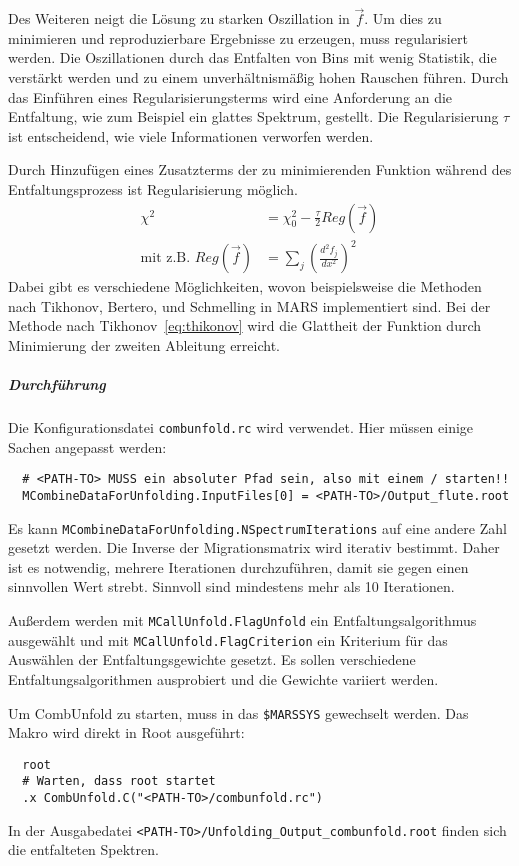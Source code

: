 Des Weiteren neigt die Lösung zu starken Oszillation in $\vec{f}$.
Um dies zu minimieren und reproduzierbare Ergebnisse zu erzeugen,
muss regularisiert werden.
Die Oszillationen durch das Entfalten von Bins mit wenig Statistik,
die verstärkt werden und zu einem unverhältnismäßig hohen Rauschen führen.
Durch das Einführen eines Regularisierungsterms wird eine Anforderung an die
Entfaltung, wie zum Beispiel ein glattes Spektrum, gestellt.
Die Regularisierung $\tau$ ist entscheidend, wie viele
Informationen verworfen werden.

Durch Hinzufügen eines Zusatzterms der zu minimierenden Funktion während des
Entfaltungsprozess ist Regularisierung möglich.
\begin{align}
    \chi^2 &= \chi^2_0 - \frac{\tau}{2} Reg(\vec{f}) \\
    \text{mit z.B. } Reg(\vec{f}) &= \sum_j {\left( \frac{d^2 f_j}{dx^2} \right)}^2
    \label{eq:thikonov}
\end{align}
Dabei gibt es verschiedene Möglichkeiten,
wovon beispielsweise die Methoden nach
Tikhonov, Bertero, und Schmelling
in MARS implementiert sind.
Bei der Methode nach Tikhonov~\eqref{eq:thikonov} wird die Glattheit der
Funktion durch Minimierung der zweiten Ableitung erreicht.

\subparagraph{Durchführung}%

Die Konfigurationsdatei \texttt{combunfold.rc} wird verwendet.
Hier müssen einige Sachen angepasst werden:
\begin{lstlisting}
  # <PATH-TO> MUSS ein absoluter Pfad sein, also mit einem / starten!!
  MCombineDataForUnfolding.InputFiles[0] = <PATH-TO>/Output_flute.root
\end{lstlisting}
Es kann
\texttt{MCombineDataForUnfolding.NSpectrumIterations}
auf eine andere Zahl gesetzt werden.
Die Inverse der Migrationsmatrix wird iterativ bestimmt.
Daher ist es notwendig, mehrere
Iterationen durchzuführen, damit sie gegen einen sinnvollen Wert strebt.
Sinnvoll sind mindestens mehr als 10 Iterationen.

Außerdem werden mit
\texttt{MCallUnfold.FlagUnfold}
ein Entfaltungsalgorithmus ausgewählt und mit
\texttt{MCallUnfold.FlagCriterion}
ein Kriterium für das Auswählen der Entfaltungsgewichte gesetzt.
Es sollen verschiedene Entfaltungsalgorithmen ausprobiert
und die Gewichte variiert werden.

Um CombUnfold zu starten, muss in das
\texttt{\$MARSSYS}
gewechselt werden.
Das Makro wird direkt in Root ausgeführt:
\begin{lstlisting}
  root
  # Warten, dass root startet
  .x CombUnfold.C("<PATH-TO>/combunfold.rc")
\end{lstlisting}

In der Ausgabedatei
\texttt{<PATH-TO>/Unfolding\_Output\_combunfold.root}
finden sich die entfalteten Spektren.
